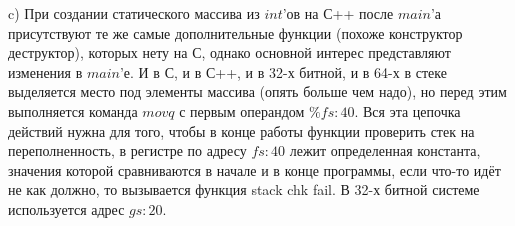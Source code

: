 \documentclass[a4paper,12pt]{article}
\begin{document}
c) При создании статического массива из $int$'ов на С++ после $main$'а присутствуют те же самые дополнительные функции (похоже конструктор деструктор), которых нету на С, однако основной интерес представляют изменения в $main$'е. И в С, и в С++, и в 32-х битной, и в 64-х в стеке выделяется место под элементы массива (опять больше  чем надо), но перед этим выполняется команда $movq$ с первым операндом $\% fs:40$. Вся эта цепочка действий нужна для того, чтобы в конце работы функции проверить стек на переполненность, в регистре по адресу $fs:40$ лежит определенная константа, значения которой сравниваются в начале и в конце программы, если что-то идёт не как должно, то вызывается функция stack chk fail. В 32-х битной системе используется адрес $gs:20$.           

\begin{figure}[H]\label{fig: 2вC64 and 2вC++64}
\end{figure}
\end{document}
